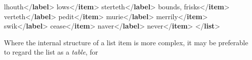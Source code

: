 \documentclass[11pt,twoside]{article}\makeatletter
\begin{document}
\begin{shaded}
lhouth{</\textbf{label}>}\mbox{}\newline 
{}lows{</\textbf{item}>}\mbox{}\newline 
{}sterteth{</\textbf{label}>}\mbox{}\newline 
{}bounds, frisks{</\textbf{item}>}\mbox{}\newline 
{}verteth{</\textbf{label}>}\mbox{}\newline 
{}pedit{</\textbf{item}>}\mbox{}\newline 
{}murie{</\textbf{label}>}\mbox{}\newline 
{}merrily{</\textbf{item}>}\mbox{}\newline 
{}swik{</\textbf{label}>}\mbox{}\newline 
{}cease{</\textbf{item}>}\mbox{}\newline 
{}naver{</\textbf{label}>}\mbox{}\newline 
{}never{</\textbf{item}>}\mbox{}\newline 
{</\textbf{list}>}\end{shaded}\egroup\par \par Where the internal structure of a list item is more complex, it
may be preferable to regard the list as a \emph{table}, for
\end{document}
